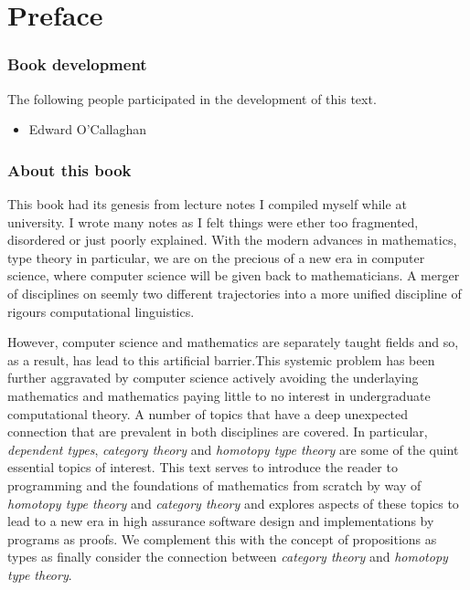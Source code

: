 %
%

\chapter*{Preface}
\label{cha:preface}


\subsection*{Book development}
The following people participated in the development of this text.

\begin{multicols}{2}{
\begin{itemize}
\item[] Edward O'Callaghan
\end{itemize}
}
\end{multicols}


\subsection*{About this book}


This book had its genesis from lecture notes I compiled myself while at
university. I wrote many notes as I felt things were ether too fragmented,
disordered or just poorly explained. With the modern advances in mathematics,
type theory in particular, we are on the precious of a new era in computer
science, where computer science will be given back to mathematicians. A merger
of disciplines on seemly two different trajectories into a more unified
discipline of rigours computational linguistics.

However, computer science and mathematics are separately taught fields and so,
as a result, has lead to this artificial barrier.This systemic problem has
been further aggravated by computer science actively avoiding the underlaying
mathematics and mathematics paying little to no interest in undergraduate
computational theory. A number of topics that have a deep unexpected connection
that are prevalent in both disciplines are covered. In particular,
\emph{dependent types}, \emph{category theory} and \emph{homotopy type theory}
are some of the quint essential topics of interest. This text serves to
introduce the reader to programming and the foundations of mathematics from
scratch by way of \emph{homotopy type theory} and \emph{category theory} and
explores aspects of these topics to lead to a new era in high assurance
software design and implementations by programs as proofs. We complement this
with the concept of propositions as types as finally consider the connection
between \emph{category theory} and \emph{homotopy type theory}.


